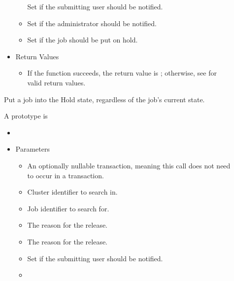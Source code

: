 \begin{description}
\begin{itemize}
\begin{itemize}
      Set if the submitting user should be notified.
      \item[] 

      Set if the administrator should be notified.
      \item[] 
      
      Set if the job should be put on hold.
    \end{itemize}
    \item[] Return Values
    \begin{itemize}
      \item[] If the function succeeds, the return value is ; 
      otherwise, see  for valid return values.
    \end{itemize}
  \end{itemize}   

  Put a job into the Hold state, regardless of the job's current state.

\item [\Code{releaseJob}]
  A prototype is 

  \begin{itemize}
    \item[] 
    \item[] Parameters
    \begin{itemize}
      \item[]  

      An optionally nullable transaction, meaning this call does not 
      need to occur in a transaction. 
      \item[]  

      Cluster identifier to search in.
      \item[] 

      Job identifier to search for.
      \item[] 

      The reason for the release.
      \item[] 

      The reason for the release.      
      \item[] 

      Set if the submitting user should be notified.
      \item[] 


\end{itemize}
\end{itemize}
\end{description}

